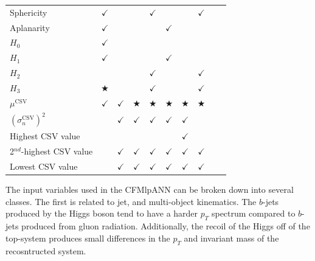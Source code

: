 \begin{table}[htp]
\begin{tabular}{|l|c|c|c|c|c|c|c||c|c|}
Sphericity & $\checkmark$ & & & $\checkmark$ & & & $\checkmark$ \\
Aplanarity & $\checkmark$ & & & & $\checkmark$ & &  \\
$H_0$ & $\checkmark$ & & & & & &   \\
$H_1$ & $\checkmark$ & & & & $\checkmark$ & & \\
$H_2$ & & & & $\checkmark$ & & & $\checkmark$    \\
$H_3$ & $\bigstar$ & & & $\checkmark$ & & & $\checkmark$  \\
$\mu^{\text{CSV}}$ & $\checkmark$ & $\checkmark$ & $\bigstar$ & $\bigstar$ & $\bigstar$ & $\bigstar$ & $\bigstar$  \\
$(\sigma_n^{\text{CSV}})^2$ & & $\checkmark$ & $\checkmark$ & $\checkmark$ & $\checkmark$ & $\checkmark$ &  \\
Highest CSV value & & & & & & $\checkmark$ &  \\
2$^{nd}$-highest CSV value & & $\checkmark$ & $\checkmark$ & $\checkmark$ & $\checkmark$ & $\checkmark$ & $\checkmark$  \\
Lowest CSV value & & $\checkmark$ & $\checkmark$ & $\checkmark$ & $\checkmark$ & $\checkmark$ & $\checkmark$ \\ \hline
 \end{tabular}
\end{table}

\par The input variables used in the CFMlpANN can be broken down into
several classes.  The first is related to jet, and multi-object
kinematics.  The $b$-jets produced by the Higgs boson tend to have a
harder $p_{T}$ spectrum compared to $b$-jets produced from gluon
radiation.  Additionally, the recoil of the Higgs off of the
top-system produces small differences in the $p_{T}$ and invariant
mass of the recosntructed \ttjets system. 

